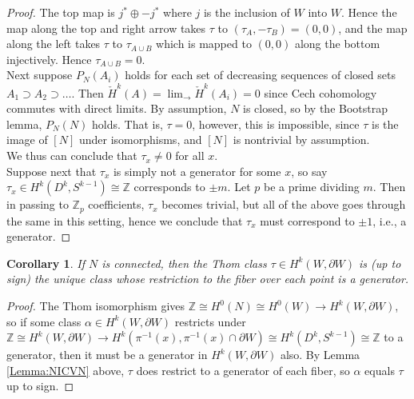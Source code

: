 \documentclass[reqno]{amsart}
\newtheorem{corollary}[theorem]{Corollary}
\theoremstyle{definition}
\theoremstyle{remark}
\begin{document}
\begin{proof}
     The top map is  $j^{*} \oplus - j^{*}$ where
     $j$ is the inclusion of $W$ into $W$.
     Hence the map along the top and right arrow takes
     $\tau$ to $\left( \tau_A, - \tau_B \right) = (0,0)$, and
     the map along the left takes $\tau$ to
      $\tau_{A \cup B}$ which is mapped to
      $(0,0)$ along the bottom injectively. Hence
      $\tau_{A \cup B} = 0$.\\
      \linebreak
      Next suppose $P_N (A_i)$ holds for each set of decreasing
      sequences of closed sets
      $ A_1 \supset A_2 \supset \ldots$. Then
      $\check{H}^{k}(A) = \lim_{\rightarrow} \check{H}^{k}(A_i) = 0 $ since
      Cech cohomology commutes with direct limits.
      By assumption, $N$ is closed, so by
      the Bootstrap lemma, $P_N(N)$ holds. That is,
      $\tau = 0$, however, this is impossible, since
      $\tau$ is the image of $\left[ N \right] $ under isomorphisms,
      and $\left[ N \right] $ is nontrivial by assumption.\\
      We thus can conclude that $\tau_x \neq 0$ for all $x$.\\

      Suppose next that $\tau_x$ is simply not a generator
      for some $x$, so
      say $\tau_x \in H^{k}(D^{k}, S^{k-1}) \cong \mathbb{Z}$ corresponds
      to $\pm m$. Let $p$ be a prime dividing $m$. Then in passing
      to $\mathbb{Z}_p$ coefficients, $\tau_x$ becomes trivial,
      but all of the above goes through the same in this setting,
      hence we conclude that $\tau_x$ must correspond to
      $\pm 1$, i.e., a generator.



  \end{proof}

      \begin{corollary}
          If $N$ is connected, then the Thom class
          $\tau \in H^{k}(W, \partial W)$ is (up to sign) the
          unique class whose restriction to the fiber over
          each point is a generator. 
      \end{corollary}
      
      \begin{proof}
          The Thom isomorphism gives
          $\mathbb{Z} \cong H^{0}(N) \cong H^{0}(W) \to H^{k}(W, \partial W)$,
          so if some class $\alpha \in H^{k}(W, \partial W)$ restricts
          under $\mathbb{Z} \cong 
          H^{k}(W , \partial W) \to H^{k}(\pi^{-1}(x), 
          \pi^{-1}(x) \cap \partial W) \cong 
          H^{k}(D^{k}, S^{k-1}) \cong \mathbb{Z}$ to a generator, then
          it must be a generator in
          $H^{k}(W, \partial W)$ also.
          By Lemma \ref{Lemma:NICVN} above, $\tau$ does
          restrict to a generator of each fiber, so
          $\alpha$ equals $\tau$ up to sign.
      \end{proof}
\end{document}

